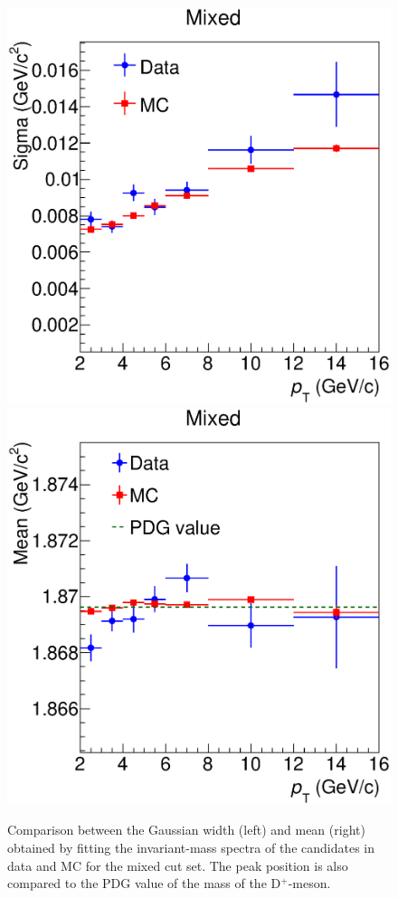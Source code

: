 \documentclass[b5paper,10pt,twoside,oldstyle,classica]{toptesi}
\begin{document}
\begin{figure}[tb]
\begin{center}
{\includegraphics[scale = 0.32]{MassSigmaSet2.eps}}
\hspace{-0.5cm}
{\includegraphics[scale = 0.32]{MassMeanSet2.eps}}
\caption{Comparison between the Gaussian width (left) and mean (right) obtained by fitting the invariant-mass spectra of the candidates in data and MC for the mixed cut set. The peak position is also compared to the PDG value of the mass of the D$^+$-meson.}
\label{cutvar_masscomp}
\end{center}
\end{figure}
\end{document}
